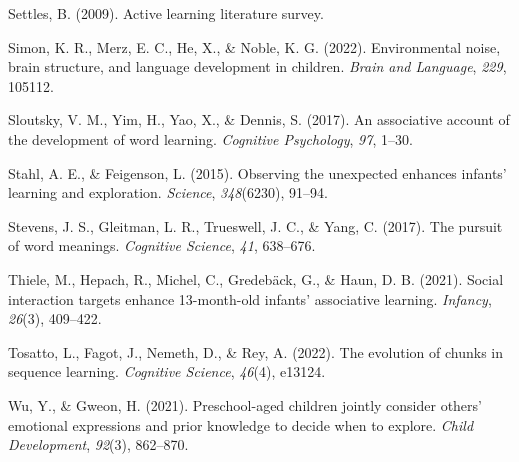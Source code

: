 \documentclass[10pt, letterpaper]{article}
\newenvironment{CSLReferences}%
  {}%
  {\par}
\begin{document}
\begin{CSLReferences}{1}{0}
\leavevmode{}%
Settles, B. (2009). Active learning literature survey.

\leavevmode{}%
Simon, K. R., Merz, E. C., He, X., \& Noble, K. G. (2022). Environmental
noise, brain structure, and language development in children.
\emph{Brain and Language}, \emph{229}, 105112.

\leavevmode{}%
Sloutsky, V. M., Yim, H., Yao, X., \& Dennis, S. (2017). An associative
account of the development of word learning. \emph{Cognitive
Psychology}, \emph{97}, 1--30.

\leavevmode{}%
Stahl, A. E., \& Feigenson, L. (2015). Observing the unexpected enhances
infants' learning and exploration. \emph{Science}, \emph{348}(6230),
91--94.

\leavevmode{}%
Stevens, J. S., Gleitman, L. R., Trueswell, J. C., \& Yang, C. (2017).
The pursuit of word meanings. \emph{Cognitive Science}, \emph{41},
638--676.

\leavevmode{}%
Thiele, M., Hepach, R., Michel, C., Gredebäck, G., \& Haun, D. B.
(2021). Social interaction targets enhance 13-month-old infants'
associative learning. \emph{Infancy}, \emph{26}(3), 409--422.

\leavevmode{}%
Tosatto, L., Fagot, J., Nemeth, D., \& Rey, A. (2022). The evolution of
chunks in sequence learning. \emph{Cognitive Science}, \emph{46}(4),
e13124.

\leavevmode{}%
Wu, Y., \& Gweon, H. (2021). Preschool-aged children jointly consider
others' emotional expressions and prior knowledge to decide when to
explore. \emph{Child Development}, \emph{92}(3), 862--870.

\end{CSLReferences}


\end{document}
